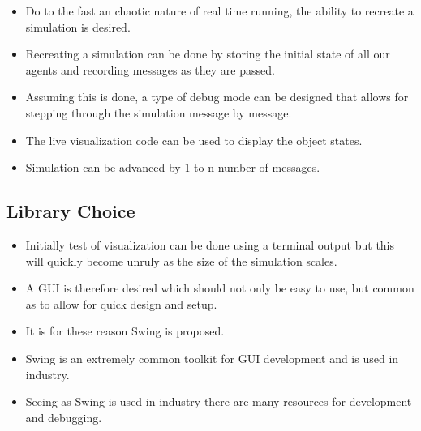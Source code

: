 \documentclass[a4paper]{article}
\begin{document}
	\begin{itemize}
	\item Do to the fast an chaotic nature of real time running, the ability to recreate a simulation is desired.
	\item Recreating a simulation can be done by storing the initial state of all our agents and recording messages as they are passed.
	\item Assuming this is done, a type of debug mode can be designed that allows for stepping through the simulation message by message.
	\item The live visualization code can be used to display the object states.
	\item Simulation can be advanced by 1 to n number of messages.
	\end{itemize}
	
	\subsection{Library Choice}
	
	\begin{itemize}
	\item Initially test of visualization can be done using a terminal output but this will quickly become unruly as the size of the simulation scales.
	\item A GUI is therefore desired which should not only be easy to use, but common as to allow for quick design and setup.
	\item It is for these reason Swing is proposed.
	\item Swing is an extremely common toolkit for GUI development and is used in industry.
	\item Seeing as Swing is used in industry there are many resources for development and debugging.
	\end{itemize}
	
\end{document}
